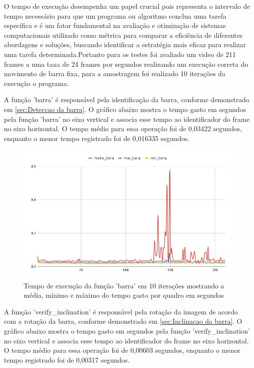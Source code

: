 O tempo de execução desempenha um papel crucial pois representa o intervalo de tempo necessário para que um programa ou algoritmo conclua uma tarefa específica e é um fator fundamental na avaliação e otimização de sistemas computacionais utilizado como métrica para comparar a eficiência de diferentes abordagens e soluções, buscando identificar a estratégia mais eficaz para realizar uma tarefa determinada.Portanto para os testes foi avaliado um video de 211 frames a uma taxa de 24 frames por segundos realizando um execução correta do movimento de barra fixa, para a amostragem foi realizado 10 iterações da execução o programa.


 
A função 'barra' é responsável pela identificação da barra, conforme demonstrado em \ref{sec:Deteccao da barra}. O gráfico abaixo mostra o tempo gasto em segundos pela função 'barra' no eixo vertical e associa esse tempo ao identificador do frame no eixo horizontal. O tempo médio para essa operação foi de 0,03422 segundos, enquanto o menor tempo registrado foi de 0,016335 segundos.

\begin{figure}[!htb]
	\centering
	\includegraphics[scale=0.6]{figuras/grafico/barra.png}
	\caption{Tempo de execução da função 'barra' em 10 iterações mostrando a média, mínimo e máximo do tempo gasto por quadro em segundos}
\end{figure}


A função 'verify\_inclination' é responsável pela rotação da imagem de acordo com a rotação da barra, conforme demonstrado em \ref{sec:Inclinacao da barra}. O gráfico abaixo mostra o tempo gasto em segundos pela função 'verify\_inclination' no eixo vertical e associa esse tempo ao identificador do frame no eixo horizontal. O tempo médio para essa operação foi de 0,00603 segundos, enquanto o menor tempo registrado foi de 0,00317 segundos.

